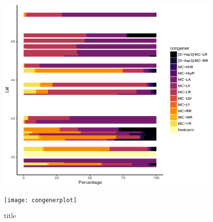\documentclass{ou-thesis}
\begin{document}
\begin{appendix}
\newpage

\begin{figure}[!htp]
  \caption{}
  \includegraphics[scale=0.9]{congeners}
  \label{ss}
\end{figure}

\newpage

\begin{figure}[!htp]
  \caption{title}
  \texttt{[image: congenerplot]}
\end{figure}

\newpage


\end{appendix}
\end{document}
